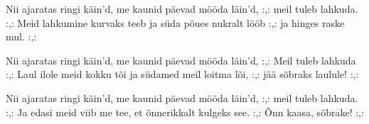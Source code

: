 Nii ajaratas ringi k\"ain'd,
me kaunid p\"aevad m\"o\"oda l\"ain'd,
:,: meil tuleb lahkuda. :,:
Meid lahkumine kurvaks teeb
ja s\"uda p\~oues nukralt l\"o\"ob
:,: ja hinges raske mul. :,:

Nii ajaratas ringi k\"ain'd,
me kaunid p\"aevad m\"o\"oda l\"ain'd,
:,: Meil tuleb lahkuda :,:
Laul ilole meid kokku t\~oi
ja s\"udamed meil loitma l\~oi,
:,: j\"a\"a s\~obraks laulule! :,:

Nii ajaratas ringi k\"ain'd,
me kaunid p\"aevad m\"o\"oda l\"ain'd,
:,: meil tuleb lahkuda. :,:
Ja edasi meid viib me tee,
et \~onnerikkalt kulgeks see.
:,: \~Onn kaasa, s\~obrake! :,: